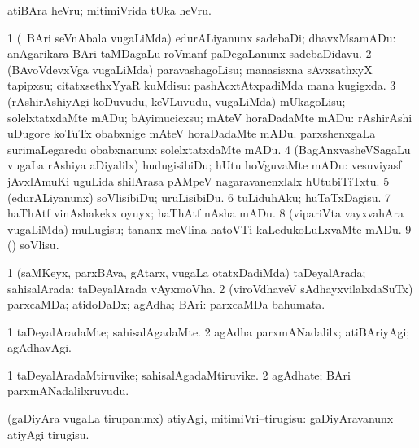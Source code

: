 \bentry
{}
\gl{\sakirx}
\bmng
atiBAra heVru; mitimiVrida tUka heVru. 
\emng
\eentry

\bentry
{}
\gl{\sakirx}
\bmng
\bnum
\num{1} (\kanmu\ BAri seVnAbala \mo vugaLiMda) edurALiyanunx sadebaDi; dhavxMsamADu:  anAgarikara BAri taMDagaLu roVmanf paDegaLanunx sadebaDidavu. 
\num{2} (BAvoVdevxVga \mo vugaLiMda) paravashagoLisu; manasisxna sAvxsathxyX tapipxsu; citatxsethxYyaR kuMdisu:  pashAcxtAtxpadiMda mana kugigxda. 
\num{3} (rAshirAshiyAgi koDuvudu, keVLuvudu, \mo vugaLiMda) mUkagoLisu; solelxtatxdaMte mADu; bAyimucicxsu; mAteV horaDadaMte mADu:  rAshirAshi uDugore koTuTx obabxnige mAteV horaDadaMte mADu.  parxshenxgaLa surimaLegaredu obabxnanunx solelxtatxdaMte mADu. 
\num{4} (BagAnxvasheVSagaLu \mo vugaLa rAshiya aDiyalilx) hudugisibiDu; hUtu hoVguvaMte mADu:  vesuviyasf jAvxlAmuKi uguLida shilArasa pAMpeV nagaravanenxlalx hUtubiTiTxtu. 
\num{5} (edurALiyanunx) soVlisibiDu; uruLisibiDu. 
\num{6} tuLiduhAku; huTaTxDagisu. 
\num{7} haThAtf vinAshakekx oyuyx; haThAtf nAsha mADu. 
\num{8} (vipariVta vayxvahAra \mo vugaLiMda) muLugisu; tananx meVlina hatoVTi kaLedukoLuLxvaMte mADu. 
\num{9} (\pArxparx) soVlisu. 
\enum
\emng
\eentry

\bentry
{}
\gl{\gu}
\bmng
\bnum
\num{1} (saMKeyx, parxBAva, gAtarx, \mo vugaLa otatxDadiMda) taDeyalArada; sahisalArada:  taDeyalArada vAyxmoVha. 
\num{2} (viroVdhaveV sAdhayxvilalxdaSuTx) parxcaMDa; atidoDaDx; agAdha; BAri:  parxcaMDa bahumata. 
\enum
\emng
\eentry

\bentry
{}
\gl{\kirxvi}
\bmng
\bnum
\num{1} taDeyalAradaMte; sahisalAgadaMte. 
\num{2} agAdha parxmANadalilx; atiBAriyAgi; agAdhavAgi. 
\enum
\emng
\eentry

\bentry
{}
\gl{\nA}
\bmng
\bnum
\num{1} taDeyalAradaMtiruvike; sahisalAgadaMtiruvike. 
\num{2} agAdhate; BAri parxmANadalilxruvudu. 
\enum
\emng
\eentry

\bentry
{}
\gl{\sakirx}
\bmng
(gaDiyAra \mo vugaLa tirupanunx) atiyAgi, mitimiVri--tirugisu:  gaDiyAravanunx atiyAgi tirugisu. 
\emng
\eentry

